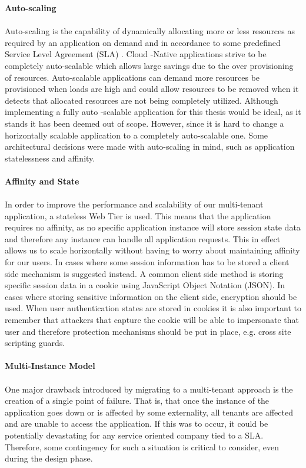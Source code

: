\textbf{Auto-scaling}
\\
\\
Auto-scaling is the capability of dynamically allocating more or less resources as required by an application on demand and in accordance to some predefined Service Level Agreement (SLA) \cite{Homer2014}. Cloud -Native applications strive to be completely auto-scalable which allows large savings due to the over provisioning of resources. Auto-scalable applications can demand more resources be provisioned when loads are high and could allow resources to be removed when it detects that allocated resources are not being completely utilized. Although implementing a fully auto -scalable application for this thesis would be ideal, as it stands it has been deemed out of scope. However, since it is hard to change a horizontally scalable application to a completely auto-scalable one. Some architectural decisions were made with auto-scaling in mind, such as application statelessness and affinity.
\\
\\
\textbf{Affinity and State}
\\
\\
In order to improve the performance and scalability of our multi-tenant application, a stateless Web Tier is used. This means that the application requires no affinity, as no specific application instance will store session state data and therefore any instance can handle all application requests. This in effect allows us to scale horizontally without having to worry about maintaining affinity for our users. In cases where some session information has to be stored a client side mechanism is suggested instead. A common client side method is storing specific session data in a cookie using JavaScript Object Notation (JSON). In cases where storing sensitive information on the client side, encryption should be used. When user authentication states are stored in cookies it is also important to remember that attackers that capture the cookie will be able to impersonate that user and therefore protection mechanisms should be put in place, e.g. cross site scripting guards.
\\
\\
\textbf{Multi-Instance Model}
\\
\\
\label{sec:multiinstance}
One major drawback introduced by migrating to a multi-tenant approach is the creation of a single point of failure. That is, that once the instance of the application goes down or is affected by some externality, all tenants are affected and are unable to access the application. If this was to occur, it could be potentially devastating for any service oriented company tied to a SLA. Therefore, some contingency for such a situation is critical to consider, even during the design phase.
 
